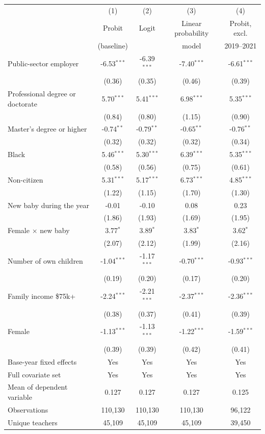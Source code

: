 \begin{tabular}{lcccc}
\toprule
 & (1) & (2) & (3) & (4) \\
 & Probit & Logit & Linear probability & Probit, excl. \\
 & (baseline) & & model & 2019--2021 \\
\midrule
Public-sector employer & -6.53$^{***}$ & -6.39$^{***}$ & -7.40$^{***}$ & -6.61$^{***}$ \\
 & (0.36) & (0.35) & (0.46) & (0.39) \\[2pt]
Professional degree or doctorate & 5.70$^{***}$ & 5.41$^{***}$ & 6.98$^{***}$ & 5.35$^{***}$ \\
 & (0.84) & (0.80) & (1.15) & (0.90) \\[2pt]
Master's degree or higher & -0.74$^{**}$ & -0.79$^{**}$ & -0.65$^{**}$ & -0.76$^{**}$ \\
 & (0.32) & (0.32) & (0.32) & (0.34) \\[2pt]
Black & 5.46$^{***}$ & 5.30$^{***}$ & 6.39$^{***}$ & 5.35$^{***}$ \\
 & (0.58) & (0.56) & (0.75) & (0.61) \\[2pt]
Non-citizen & 5.31$^{***}$ & 5.17$^{***}$ & 6.73$^{***}$ & 4.85$^{***}$ \\
 & (1.22) & (1.15) & (1.70) & (1.30) \\[2pt]
New baby during the year & -0.01 & -0.10 & 0.08 & 0.23 \\
 & (1.86) & (1.93) & (1.69) & (1.95) \\[2pt]
Female $\times$ new baby & 3.77$^{*}$ & 3.89$^{*}$ & 3.83$^{*}$ & 3.62$^{*}$ \\
 & (2.07) & (2.12) & (1.99) & (2.16) \\[2pt]
Number of own children & -1.04$^{***}$ & -1.17$^{***}$ & -0.70$^{***}$ & -0.93$^{***}$ \\
 & (0.19) & (0.20) & (0.17) & (0.20) \\[2pt]
Family income \$75k+ & -2.24$^{***}$ & -2.21$^{***}$ & -2.37$^{***}$ & -2.36$^{***}$ \\
 & (0.38) & (0.37) & (0.41) & (0.39) \\[2pt]
Female & -1.13$^{***}$ & -1.13$^{***}$ & -1.22$^{***}$ & -1.59$^{***}$ \\
 & (0.39) & (0.39) & (0.42) & (0.41) \\[2pt]
\midrule
Base-year fixed effects & Yes & Yes & Yes & Yes \\
Full covariate set & Yes & Yes & Yes & Yes \\
Mean of dependent variable & 0.127 & 0.127 & 0.127 & 0.125 \\
Observations & 110,130 & 110,130 & 110,130 & 96,122 \\
Unique teachers & 45,109 & 45,109 & 45,109 & 39,450 \\
\bottomrule
\end{tabular}

